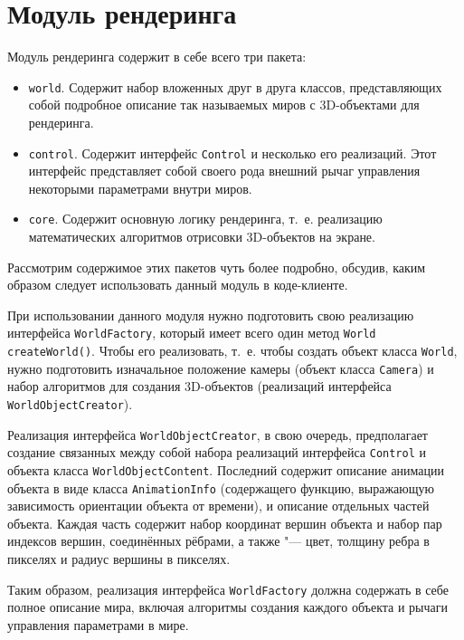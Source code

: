 \section{Модуль рендеринга}

Модуль рендеринга содержит в себе всего три пакета:

\begin{itemize}

\item \texttt{world}. Содержит набор вложенных друг в друга классов, представляющих собой подробное описание так
называемых миров с 3D-объектами для рендеринга.
\item \texttt{control}. Содержит интерфейс \texttt{Control} и несколько его реализаций. Этот интерфейс представляет
собой своего рода внешний рычаг управления некоторыми параметрами внутри миров.
\item \texttt{core}. Содержит основную логику рендеринга, т.~е. реализацию математических алгоритмов отрисовки
3D-объектов на экране.

\end{itemize}

Рассмотрим содержимое этих пакетов чуть более подробно, обсудив, каким образом следует использовать данный модуль
в коде-клиенте.

При использовании данного модуля нужно подготовить свою реализацию интерфейса \texttt{World\-Factory}, который имеет
всего один метод \texttt{World createWorld()}. Чтобы его реализовать, т.~е. чтобы создать объект класса \texttt{World},
нужно подготовить изначальное положение камеры (объект класса \texttt{Camera}) и набор алгоритмов для создания
3D-объектов (реализаций интерфейса \texttt{WorldObjectCreator}).

Реализация интерфейса \texttt{WorldObjectCreator}, в свою очередь, предполагает создание связанных между собой набора
реализаций интерфейса \texttt{Control} и объекта класса \texttt{WorldObjectContent}. Последний содержит описание
анимации объекта в виде класса \texttt{AnimationInfo} (содержащего функцию, выражающую зависимость ориентации объекта
от времени), и описание отдельных частей объекта. Каждая часть содержит набор координат вершин объекта и набор пар
индексов вершин, соединённых рёбрами, а также "--- цвет, толщину ребра в пикселях и радиус вершины в пикселях.

Таким образом, реализация интерфейса \texttt{World\-Factory} должна содержать в себе полное описание мира, включая
алгоритмы создания каждого объекта и рычаги управления параметрами в мире.


